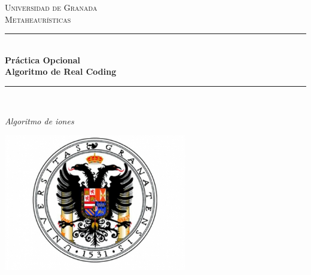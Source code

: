 \documentclass[a4paper,11pt]{article}
\begin{document}
\begin{titlepage}

\newcommand{\HRule}{\rule{\linewidth}{0.5mm}} %

\center %
 
\textsc{\LARGE Universidad de Granada}\\[1.5cm]
\textsc{\Large Metaheaurísticas}\\[0.5cm] 

\bigskip
\HRule \\[0.4cm]
{ \huge \bfseries Práctica Opcional}\\[0.4cm] %
{ \huge \bfseries Algoritmo de Real Coding}\\
\HRule \\[1.5cm]
 

\begin{minipage}{\textwidth}
\begin{center} \large
\emph{Algoritmo de iones}\\
\end{center}
\end{minipage}


\begin{center}
\includegraphics[width=8cm]{./ugr.jpg}
\end{center}


\end{titlepage}
\end{document}
